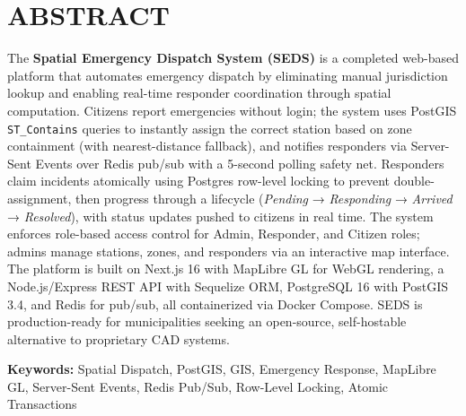 \chapter*{ABSTRACT}

The \textbf{Spatial Emergency Dispatch System (SEDS)} is a completed web-based platform that automates emergency dispatch by eliminating manual jurisdiction lookup and enabling real-time responder coordination through spatial computation. Citizens report emergencies without login; the system uses PostGIS \texttt{ST\_Contains} queries to instantly assign the correct station based on zone containment (with nearest-distance fallback), and notifies responders via Server-Sent Events over Redis pub/sub with a 5-second polling safety net. Responders claim incidents atomically using Postgres row-level locking to prevent double-assignment, then progress through a lifecycle (\textit{Pending} → \textit{Responding} → \textit{Arrived} → \textit{Resolved}), with status updates pushed to citizens in real time. The system enforces role-based access control for Admin, Responder, and Citizen roles; admins manage stations, zones, and responders via an interactive map interface. The platform is built on Next.js 16 with MapLibre GL for WebGL rendering, a Node.js/Express REST API with Sequelize ORM, PostgreSQL 16 with PostGIS 3.4, and Redis for pub/sub, all containerized via Docker Compose. SEDS is production-ready for municipalities seeking an open-source, self-hostable alternative to proprietary CAD systems.

\par
\textbf{Keywords:} Spatial Dispatch, PostGIS, GIS, Emergency Response, MapLibre GL, Server-Sent Events, Redis Pub/Sub, Row-Level Locking, Atomic Transactions

